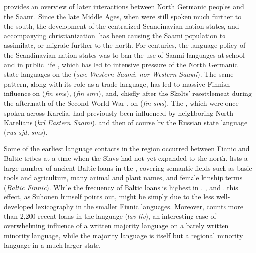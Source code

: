 \cite{zachrisson2008} provides an overview of later interactions between North Germanic peoples and the Saami. Since the late Middle Ages, when  were still spoken much further to the south, the development of the centralized Scandinavian nation states, and accompanying christianization, has been causing the Saami population to assimilate, or migrate further to the north. For centuries, the language policy of the Scandinavian nation states was to ban the use of Saami languages at school and in public life \citep{corson1995}, which has led to intensive pressure of the North Germanic state languages on the  (\textit{swe} \arrowLA \textit{Western Saami}, \textit{nor} \arrowLA \textit{Western Saami}). The same pattern, along with its role as a trade language, has led to massive Finnish influence on  (\textit{fin} \arrowOA \textit{sme}),  (\textit{fin} \arrowOA \textit{smn}), and, chiefly after the
Skolts' resettlement during the aftermath of the Second World War \citep{feist2011}, on  (\textit{fin} \arrowOA \textit{sms}). The , which were once spoken across Karelia, had previously been influenced \citep{sergejeva2000} by neighboring North Karelians (\textit{krl} \arrowOA \textit{Eastern Saami}), and then of course by the Russian state language (\textit{rus} \arrowLA \textit{sjd, sms}).

Some of the earliest language contacts in the region occurred between Finnic and Baltic tribes at a time when the Slavs had not yet expanded to the north. \cite{suhonen1988} lists a large number of ancient Baltic loans in the , covering semantic fields such as basic tools and agriculture, many animal and plant names, and female kinship terms (\textit{Baltic \arrowLA Finnic}). While the frequency of Baltic loans is highest in , , and , this effect, as Suhonen himself points out, might be simply due to the less well-developed lexicography in the smaller Finnic languages. Moreover, \cite{suhonen1973} counts more than 2,200 recent  loans in the  language (\textit{lav \arrowLA liv}), an interesting case of overwhelming influence of a written majority language on a barely written minority language, while the majority language is itself but a regional minority language in a much larger state.


